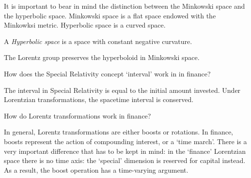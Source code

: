 \begin{framed}
It is important to bear in mind the distinction between the Minkowski space and the hyperbolic space. Minkowski space is a flat space endowed with the Minkowksi metric. Hyperbolic space is a curved space.
\end{framed}

A \emph{Hyperbolic space} is a space with constant negative curvature.

The Lorentz group preserves the hyperboloid in Minkowski space.

\begin{question}
    How does the Special Relativity concept `interval' work in in finance?
\end{question}
The interval in Special Relativity is equal to the initial amount invested. Under Lorentzian transformations, the spacetime interval is conserved.

\begin{question}
    How do Lorentz transformations work in finance?
\end{question}
In general, Lorentz transformations are either boosts or rotations. In finance, boosts represent the action of compounding interest, or a `time march'. There is a very important difference that has to be kept in mind: in the `finance' Lorentzian space there is no time axis: the `special' dimension is reserved for capital instead. As a result, the boost operation has a time-varying argument.

